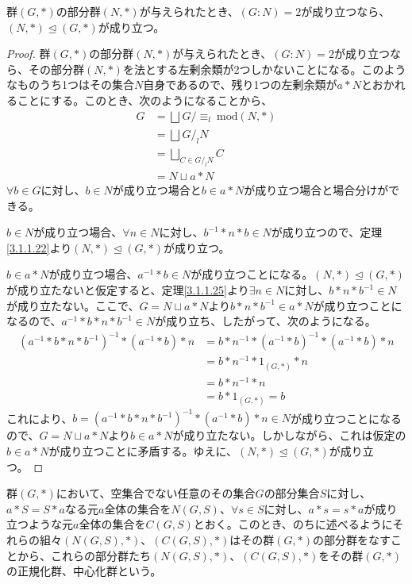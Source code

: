 \documentclass[dvipdfmx]{jsarticle}
\begin{document}
\begin{thm}\label{3.1.1.44}
群$(G,*)$の部分群$(N,*)$が与えられたとき、$(G:N) = 2$が成り立つなら、$(N,*) \trianglelefteq (G,*)$が成り立つ。
\end{thm}
\begin{proof}
群$(G,*)$の部分群$(N,*)$が与えられたとき、$(G:N) = 2$が成り立つなら、その部分群$(N,*)$を法とする左剰余類が2つしかないことになる。このようなものうち1つはその集合$N$自身であるので、残り1つの左剰余類が$a*N$とおかれることにする。このとき、次のようになることから、
\begin{align*}
G &= \bigsqcup_{} {G}/ {\equiv_{l}\ \mathrm{mod}(N,*)}\\
&= \bigsqcup_{} {G}/_l {N}\\
&= \bigsqcup_{C \in {G}/_l {N}} C\\
&= N \sqcup a*N
\end{align*}
$\forall b \in G$に対し、$b \in N$が成り立つ場合と$b \in a*N$が成り立つ場合と場合分けができる。\par
$b \in N$が成り立つ場合、$\forall n \in N$に対し、$b^{- 1}*n*b \in N$が成り立つので、定理\ref{3.1.1.22}より$(N,*) \trianglelefteq (G,*)$が成り立つ。\par
$b \in a*N$が成り立つ場合、$a^{- 1}*b \in N$が成り立つことになる。$(N,*) \trianglelefteq (G,*)$が成り立たないと仮定すると、定理\ref{3.1.1.25}より$\exists n \in N$に対し、$b*n*b^{- 1} \in N$が成り立たない。ここで、$G = N \sqcup a*N$より$b*n*b^{- 1} \in a*N$が成り立つことになるので、$a^{- 1}*b*n*b^{- 1} \in N$が成り立ち、したがって、次のようになる。
\begin{align*}
\left( a^{- 1}*b*n*b^{- 1} \right)^{- 1}*\left( a^{- 1}*b \right)*n &= b*n^{- 1}*\left( a^{- 1}*b \right)^{- 1}*\left( a^{- 1}*b \right)*n\\
&= b*n^{- 1}*1_{(G,*)}*n\\
&= b*n^{- 1}*n\\
&= b*1_{(G,*)} = b
\end{align*}
これにより、$b = \left( a^{- 1}*b*n*b^{- 1} \right)^{- 1}*\left( a^{- 1}*b \right)*n \in N$が成り立つことになるので、$G = N \sqcup a*N$より$b \in a*N$が成り立たない。しかしながら、これは仮定の$b \in a*N$が成り立つことに矛盾する。ゆえに、$(N,*) \trianglelefteq (G,*)$が成り立つ。
\end{proof}
\begin{dfn}
群$(G,*)$において、空集合でない任意のその集合$G$の部分集合$S$に対し、$a*S = S*a$なる元$a$全体の集合を$N(G,S)$、$\forall s \in S$に対し、$a*s = s*a$が成り立つような元$a$全体の集合を$C(G,S)$とおく。このとき、のちに述べるようにそれらの組々$\left( N(G,S),* \right)$、$\left( C(G,S),* \right)$はその群$(G,*)$の部分群をなすことから、これらの部分群たち$\left( N(G,S),* \right)$、$\left( C(G,S),* \right)$をその群$(G,*)$の正規化群、中心化群という。
\end{dfn}
\end{document}
